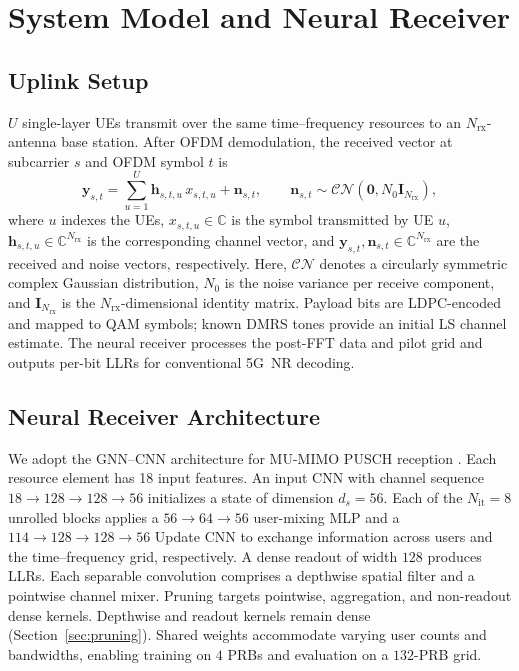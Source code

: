 \section{System Model and Neural Receiver}
\label{sec:sys_nrx}


\subsection{Uplink Setup}
\label{sec:system_model}
$U$ single-layer \glspl{UE} transmit over the same time--frequency
resources to an $N_{\mathrm{rx}}$-antenna base station. After OFDM demodulation, the
received vector at subcarrier $s$ and OFDM symbol $t$ is
\begin{equation}
\label{eq:mu_mimo}
  \mathbf{y}_{s,t}
  = \sum_{u=1}^{U}
    \mathbf{h}_{s,t,u}\,x_{s,t,u}
    + \mathbf{n}_{s,t},
  \qquad
  \mathbf{n}_{s,t}\sim\mathcal{CN}(\mathbf{0},N_0\mathbf{I}_{N_{\mathrm{rx}}}),
\end{equation}
where $u$ indexes the \glspl{UE},
$x_{s,t,u}\in\mathbb{C}$ is the symbol transmitted by UE $u$,
$\mathbf{h}_{s,t,u}\in\mathbb{C}^{N_{\mathrm{rx}}}$ is the corresponding channel vector, and
$\mathbf{y}_{s,t},\mathbf{n}_{s,t}\in\mathbb{C}^{N_{\mathrm{rx}}}$ are the received
and noise vectors, respectively. Here, $\mathcal{CN}$ denotes a
circularly symmetric complex Gaussian distribution, $N_0$ is the noise
variance per receive component, and $\mathbf{I}_{N_{\mathrm{rx}}}$ is the
$N_{\mathrm{rx}}$-dimensional identity matrix. Payload bits are \gls{LDPC}-encoded
and mapped to \gls{QAM} symbols; known \gls{DMRS} tones provide an
initial \gls{LS} channel estimate. The neural receiver processes the
post-\gls{FFT} data and pilot grid and outputs per-bit \glspl{LLR} for
conventional 5G~NR decoding.

\vspace{-2mm}

\subsection{Neural Receiver Architecture}
\label{sec:architecture}
We adopt the GNN--CNN architecture for MU-\gls{MIMO}
\gls{PUSCH} reception \cite{scamnrx,wiesmayr2024design,neural_rx}. Each resource element has 18
input features. An input CNN with
channel sequence $18{\to}128{\to}128{\to}56$ initializes a state of
dimension $d_s{=}56$. Each of the $N_{\mathrm{it}}{=}8$ unrolled
blocks applies a $56{\to}64{\to}56$ user-mixing \gls{MLP} and a
$114{\to}128{\to}128{\to}56$ Update CNN to exchange information
across users and the time--frequency grid, respectively. A dense
readout of width $128$ produces \glspl{LLR}. Each separable convolution
comprises a depthwise spatial filter and a pointwise channel mixer.
Pruning targets pointwise, aggregation, and non-readout dense kernels.
Depthwise and readout kernels remain dense
(Section~\ref{sec:pruning}). Shared weights accommodate varying user
counts and bandwidths, enabling training on $4$ \glspl{PRB} and
evaluation on a $132$-\gls{PRB} grid.

